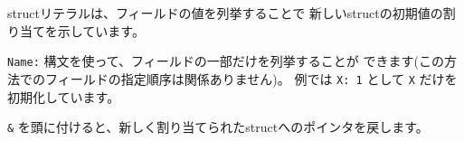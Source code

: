 structリテラルは、フィールドの値を列挙することで
新しいstructの初期値の割り当てを示しています。

\texttt{Name:} 構文を使って、フィールドの一部だけを列挙することが
できます(この方法でのフィールドの指定順序は関係ありません)。
例では \texttt{X: 1} として \texttt{X} だけを初期化しています。

\texttt{\&} を頭に付けると、新しく割り当てられたstructへのポインタを戻します。